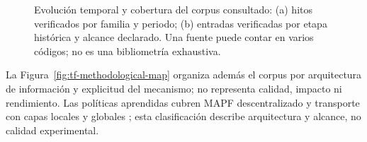 \begin{figure}[htbp]
{{%
  }}
  \caption{Evoluci\'on temporal y cobertura del corpus consultado: (a) hitos verificados por familia y periodo; (b) entradas verificadas por etapa histórica y alcance declarado. Una fuente puede contar en varios códigos; no es una bibliometr\'ia exhaustiva.}
  \label{fig:tf-literature-timeline}
  \viuownsource
\end{figure}

La Figura~\ref{fig:tf-methodological-map} organiza además el corpus por
arquitectura de información y explicitud del mecanismo; no representa calidad,
impacto ni rendimiento. Las políticas aprendidas cubren MAPF descentralizado
\parencite{sartoretti2019primal,phan2024cactus} y transporte con capas locales y globales \parencite{shibata2023localGlobal,naito2025tihdp}; esta clasificación describe arquitectura y alcance, no calidad experimental.

